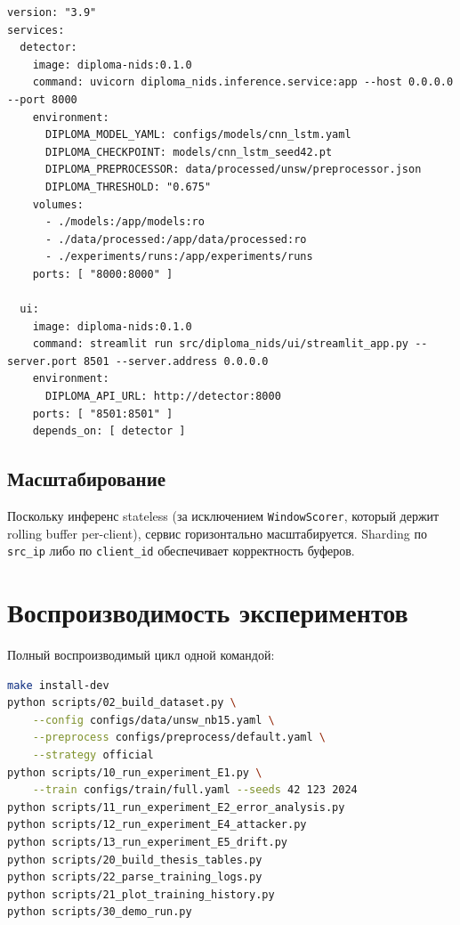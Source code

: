\documentclass[14pt, a4paper]{extarticle}
\begin{document}
\begin{lstlisting}[basicstyle=\ttfamily\small]
version: "3.9"
services:
  detector:
    image: diploma-nids:0.1.0
    command: uvicorn diploma_nids.inference.service:app --host 0.0.0.0 --port 8000
    environment:
      DIPLOMA_MODEL_YAML: configs/models/cnn_lstm.yaml
      DIPLOMA_CHECKPOINT: models/cnn_lstm_seed42.pt
      DIPLOMA_PREPROCESSOR: data/processed/unsw/preprocessor.json
      DIPLOMA_THRESHOLD: "0.675"
    volumes:
      - ./models:/app/models:ro
      - ./data/processed:/app/data/processed:ro
      - ./experiments/runs:/app/experiments/runs
    ports: [ "8000:8000" ]

  ui:
    image: diploma-nids:0.1.0
    command: streamlit run src/diploma_nids/ui/streamlit_app.py --server.port 8501 --server.address 0.0.0.0
    environment:
      DIPLOMA_API_URL: http://detector:8000
    ports: [ "8501:8501" ]
    depends_on: [ detector ]
\end{lstlisting}

\subsection{Масштабирование}

Поскольку инференс stateless (за исключением \texttt{WindowScorer},
который держит rolling buffer per-client), сервис горизонтально
масштабируется. Sharding по \texttt{src\_ip} либо по \texttt{client\_id}
обеспечивает корректность буферов.

\section{Воспроизводимость экспериментов}

Полный воспроизводимый цикл одной командой:

\begin{lstlisting}[basicstyle=\ttfamily\small, language=bash]
make install-dev
python scripts/02_build_dataset.py \
    --config configs/data/unsw_nb15.yaml \
    --preprocess configs/preprocess/default.yaml \
    --strategy official
python scripts/10_run_experiment_E1.py \
    --train configs/train/full.yaml --seeds 42 123 2024
python scripts/11_run_experiment_E2_error_analysis.py
python scripts/12_run_experiment_E4_attacker.py
python scripts/13_run_experiment_E5_drift.py
python scripts/20_build_thesis_tables.py
python scripts/22_parse_training_logs.py
python scripts/21_plot_training_history.py
python scripts/30_demo_run.py
\end{lstlisting}
\end{document}
